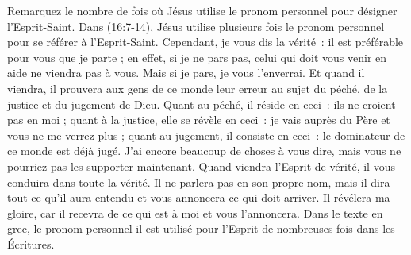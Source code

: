 Remarquez le nombre de fois où Jésus utilise le pronom personnel pour désigner l'Esprit-Saint. Dans (16:7-14), Jésus utilise plusieurs fois le pronom personnel pour se référer à l'Esprit-Saint. \og Cependant, je vous dis la vérité~: il est préférable pour vous que je parte ; en effet, si je ne pars pas, celui qui doit vous venir en aide ne viendra pas à vous. Mais si je pars, je vous l'enverrai. Et quand il viendra, il prouvera aux gens de ce monde leur erreur au sujet du péché, de la justice et du jugement de Dieu. Quant au péché, il réside en ceci~: ils ne croient pas en moi ; quant à la justice, elle se révèle en ceci~: je vais auprès du Père et vous ne me verrez plus ; quant au jugement, il consiste en ceci~: le dominateur de ce monde est déjà jugé. J'ai encore beaucoup de choses à vous dire, mais vous ne pourriez pas les supporter maintenant. Quand viendra l'Esprit de vérité, il vous conduira dans toute la vérité. Il ne parlera pas en son propre nom, mais il dira tout ce qu'il aura entendu et vous annoncera ce qui doit arriver. Il révélera ma gloire, car il recevra de ce qui est à moi et vous l'annoncera. \fg{} Dans le texte en grec, le pronom personnel \og il \fg{} est utilisé pour l'Esprit de nombreuses fois dans les Écritures.


